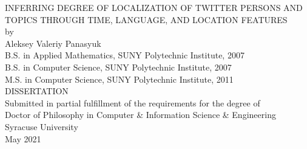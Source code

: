 \begin{titlepage}
\begin{center}
\vspace*{0.2cm}
\noindent\makebox[\linewidth]{\rule{\textwidth}{0.3pt}}
{\LARGE 
INFERRING DEGREE OF LOCALIZATION OF
TWITTER PERSONS AND TOPICS THROUGH
TIME, LANGUAGE, AND LOCATION FEATURES
}
\noindent\makebox[\linewidth]{\rule{\textwidth}{0.3pt}}\\ %
\vspace{0.5cm}
by\\%
\vspace{0.5cm}
{\large Aleksey Valeriy Panasyuk}\\[6pt]
B.S. in Applied Mathematics, SUNY Polytechnic Institute, 2007\\
B.S. in Computer Science, SUNY Polytechnic Institute, 2007\\
M.S. in Computer Science, SUNY Polytechnic Institute, 2011\\
\vspace{1.5cm}
{\large DISSERTATION}\\[6pt]
Submitted in partial fulfillment of the requirements for the degree of\\
Doctor of Philosophy in Computer \& Information Science \& Engineering\\

Syracuse University\\
May 2021
\end{center}
\end{titlepage}
